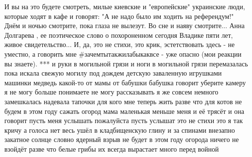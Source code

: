 И вы на это будете смотреть, милые киевские и "европейские" украинские люди, которые ходят в кафе и говорят: "А не надо было им ходить на референдум!" Днём и ночью смотрите, пока глаза не вылезут. Во сне и наяву смотрите...  Анна Долгарева
 , ее поэтическое слово о похороненном сегодня Владике пяти лет, живое свидетельство... И, да, это не стихи, это крик, эстетствовать здесь - не уместно, а говорить мне #зачемтытакжилабыкаквсе - уже опасно (мои реакции вы знаете). 
***
и руки в могильной грязи
и ноги в могильной грязи
перемазалась пока искала свежую могилу под дождем
детскую заваленную игрушками
машинки
медведь какой-то
от мамы от бабушки 
бабушка говорит уберите камеру я не могу больше 
понимаете не могу рассказывать
я же совсем немного замешкалась
надевала тапочки 
для кого мне теперь жить разве что для котов
не будем в этом году сажать огород
мама маленькая меньше меня 
и её трясёт 
и она говорит пусть меня услышать
пожалуйста пусть услышат 
это не стихи
это я так кричу
а голоса нет
весь ушёл в кладбищенскую глину 
и за спинами внезапно закатное солнце 
словно ядерный взрыв
не будет в этом году огорода
ничего не взойдёт 
разве что белые грибы 
их всегда вырастает много перед войной
